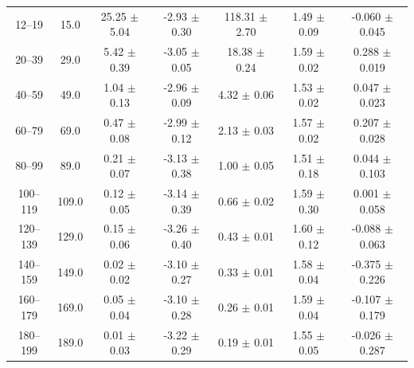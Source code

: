 \begin{table}[htbp]
\begin{tabular}{c c c c c c c}
12--19 & 15.0 & 25.25 $\pm$ 5.04 & -2.93 $\pm$ 0.30 & 118.31 $\pm$ 2.70 & 1.49 $\pm$ 0.09 & -0.060 $\pm$ 0.045 \\
20--39 & 29.0 & 5.42 $\pm$ 0.39 & -3.05 $\pm$ 0.05 & 18.38 $\pm$ 0.24 & 1.59 $\pm$ 0.02 & 0.288 $\pm$ 0.019 \\
40--59 & 49.0 & 1.04 $\pm$ 0.13 & -2.96 $\pm$ 0.09 & 4.32 $\pm$ 0.06 & 1.53 $\pm$ 0.02 & 0.047 $\pm$ 0.023 \\
60--79 & 69.0 & 0.47 $\pm$ 0.08 & -2.99 $\pm$ 0.12 & 2.13 $\pm$ 0.03 & 1.57 $\pm$ 0.02 & 0.207 $\pm$ 0.028 \\
80--99 & 89.0 & 0.21 $\pm$ 0.07 & -3.13 $\pm$ 0.38 & 1.00 $\pm$ 0.05 & 1.51 $\pm$ 0.18 & 0.044 $\pm$ 0.103 \\
100--119 & 109.0 & 0.12 $\pm$ 0.05 & -3.14 $\pm$ 0.39 & 0.66 $\pm$ 0.02 & 1.59 $\pm$ 0.30 & 0.001 $\pm$ 0.058 \\
120--139 & 129.0 & 0.15 $\pm$ 0.06 & -3.26 $\pm$ 0.40 & 0.43 $\pm$ 0.01 & 1.60 $\pm$ 0.12 & -0.088 $\pm$ 0.063 \\
140--159 & 149.0 & 0.02 $\pm$ 0.02 & -3.10 $\pm$ 0.27 & 0.33 $\pm$ 0.01 & 1.58 $\pm$ 0.04 & -0.375 $\pm$ 0.226 \\
160--179 & 169.0 & 0.05 $\pm$ 0.04 & -3.10 $\pm$ 0.28 & 0.26 $\pm$ 0.01 & 1.59 $\pm$ 0.04 & -0.107 $\pm$ 0.179 \\
180--199 & 189.0 & 0.01 $\pm$ 0.03 & -3.22 $\pm$ 0.29 & 0.19 $\pm$ 0.01 & 1.55 $\pm$ 0.05 & -0.026 $\pm$ 0.287 \\
\hline\hline
\end{tabular}
\end{table}
